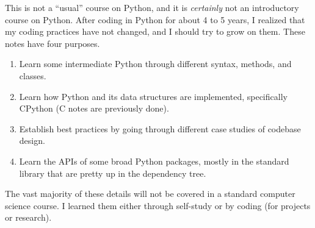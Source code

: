This is not a ``usual'' course on Python, and it is \textit{certainly} not an introductory course on Python. After coding in Python for about 4 to 5 years, I realized that my coding practices have not changed, and I should try to grow on them. These notes have four purposes. 

\begin{enumerate}
  \item Learn some intermediate Python through different syntax, methods, and classes. 
  \item Learn how Python and its data structures are implemented, specifically CPython (C notes are previously done). 
  \item Establish best practices by going through different case studies of codebase design. 
  \item Learn the APIs of some broad Python packages, mostly in the standard library that are pretty up in the dependency tree. 
\end{enumerate}

The vast majority of these details will not be covered in a standard computer science course. I learned them either through self-study or by coding (for projects or research). 

